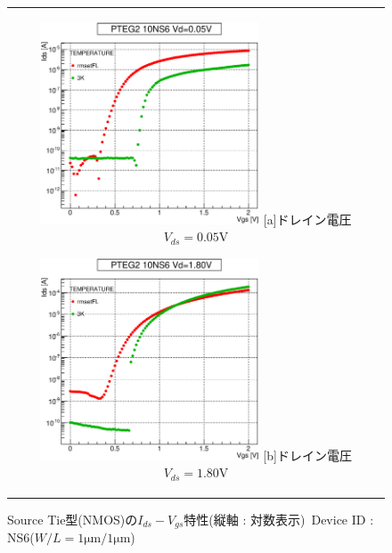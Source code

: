 			\begin{figure}[htbp]
				\begin{center}
					\begin{tabular}{c}
						\begin{minipage}{0.5\hsize}
							\begin{center}
								\includegraphics[clip, width=6.5cm]{./Chapter/Appendix/Picture/NST/NS6/PTEG10_NS6_IdVg_0.05_.log_.eps}
								\hspace{1.6cm} [a]ドレイン電圧$V_{ds}=0.05\mathrm{V}$
							\end{center}
						\end{minipage}
						\begin{minipage}{0.5\hsize}
							\begin{center}
								\includegraphics[clip, width=6.5cm]{./Chapter/Appendix/Picture/NST/NS6/PTEG10_NS6_IdVg_1.80_.log_.eps}
								\hspace{1.6cm} [b]ドレイン電圧$V_{ds}=1.80\mathrm{V}$
							\end{center}
						\end{minipage}
					\end{tabular}
					\caption{Source Tie型(NMOS)の$I_{ds}-V_{gs}$特性(縦軸 : 対数表示)\ Device ID : NS6($W/L = 1\mathrm{\mu m} / 1\mathrm{\mu m}$)}
					\label{fig:ST_N_IdVg_Vth}
				\end{center}
			\end{figure}
			
